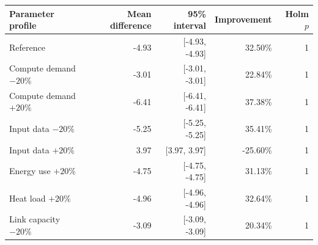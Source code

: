 \begin{tabular}{lrrrr}
\toprule
Parameter profile & Mean difference & 95\% interval & Improvement & Holm $p$ \\
\midrule
Reference & -4.93 & [-4.93, -4.93] & 32.50\% & 1 \\
Compute demand $-20\%$ & -3.01 & [-3.01, -3.01] & 22.84\% & 1 \\
Compute demand $+20\%$ & -6.41 & [-6.41, -6.41] & 37.38\% & 1 \\
Input data $-20\%$ & -5.25 & [-5.25, -5.25] & 35.41\% & 1 \\
Input data $+20\%$ & 3.97 & [3.97, 3.97] & -25.60\% & 1 \\
Energy use $+20\%$ & -4.75 & [-4.75, -4.75] & 31.13\% & 1 \\
Heat load $+20\%$ & -4.96 & [-4.96, -4.96] & 32.64\% & 1 \\
Link capacity $-20\%$ & -3.09 & [-3.09, -3.09] & 20.34\% & 1 \\
\bottomrule
\end{tabular}